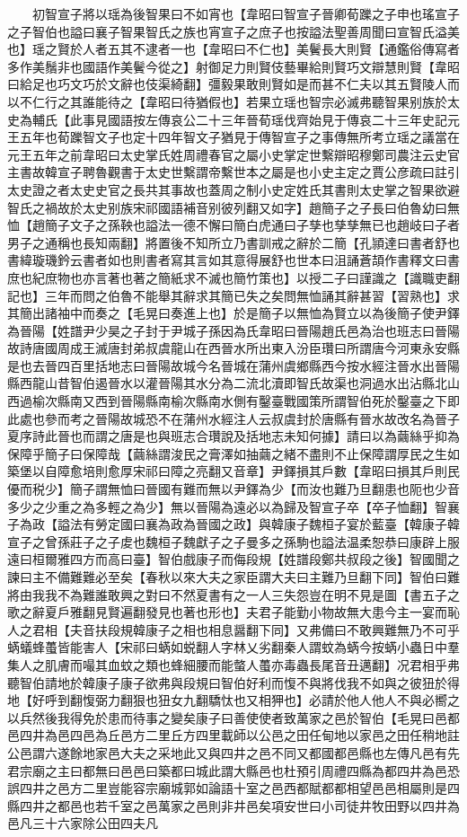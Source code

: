 　　初智宣子將以瑶為後智果曰不如宵也【韋昭曰智宣子晉卿荀躒之子申也瑤宣子之子智伯也謚曰襄子智果智氏之族也宵宣子之庶子也按謚法聖善周聞曰宣智氏溢美也】瑶之賢於人者五其不逮者一也【韋昭曰不仁也】美鬢長大則賢【通鑑俗傳寫者多作美鬚非也國語作美鬢今從之】射御足力則賢伎藝畢給則賢巧文辯慧則賢【韋昭曰給足也巧文巧於文辭也伎渠綺翻】彊毅果敢則賢如是而甚不仁夫以其五賢陵人而以不仁行之其誰能待之【韋昭曰待猶假也】若果立瑶也智宗必滅弗聽智果别族於太史為輔氏【此事見國語按左傳哀公二十三年晉荀瑶伐齊始見于傳哀二十三年史記元王五年也荀躒智文子也定十四年智文子猶見于傳智宣子之事傳無所考立瑶之議當在元王五年之前韋昭曰太史掌氏姓周禮春官之屬小史掌定世繫辯昭穆鄭司農注云史官主書故韓宣子聘魯觀書于太史世繫謂帝繫世本之屬是也小史主定之賈公彦疏曰註引太史證之者太史史官之長共其事故也蓋周之制小史定姓氏其書則太史掌之智果欲避智氏之禍故於太史别族宋祁國語補音别彼列翻又如字】趙簡子之子長曰伯魯幼曰無恤【趙簡子文子之孫鞅也謚法一德不懈曰簡白虎通曰子孳也孳孳無已也趙岐曰子者男子之通稱也長知兩翻】將置後不知所立乃書訓戒之辭於二簡【孔頴達曰書者舒也書緯璇璣鈐云書者如也則書者寫其言如其意得展舒也世本曰沮誦蒼頡作書釋文曰書庶也紀庶物也亦言著也著之簡紙求不滅也簡竹策也】以授二子曰謹識之【識職吏翻記也】三年而問之伯魯不能舉其辭求其簡已失之矣問無恤誦其辭甚習【習熟也】求其簡出諸袖中而奏之【毛晃曰奏進上也】於是簡子以無恤為賢立以為後簡子使尹鐸為晉陽【姓譜尹少昊之子封于尹城子孫因為氏韋昭曰晉陽趙氏邑為治也班志曰晉陽故詩唐國周成王滅唐封弟叔虞龍山在西晉水所出東入汾臣瓚曰所謂唐今河東永安縣是也去晉四百里括地志曰晉陽故城今名晉城在蒲州虞鄉縣西今按水經注晉水出晉陽縣西龍山昔智伯遏晉水以灌晉陽其水分為二流北瀆即智氏故渠也洞過水出沾縣北山西過榆次縣南又西到晉陽縣南榆次縣南水側有鑿臺戰國策所謂智伯死於鑿臺之下即此處也參而考之晉陽故城恐不在蒲州水經注人云叔虞封於唐縣有晉水故改名為晉子夏序詩此晉也而謂之唐是也與班志合瓚說及括地志未知何據】請曰以為繭絲乎抑為保障乎簡子曰保障哉【繭絲謂浚民之膏澤如抽繭之緒不盡則不止保障謂厚民之生如築堡以自障愈培則愈厚宋祁曰障之亮翻又音章】尹鐸損其戶數【韋昭曰損其戶則民優而税少】簡子謂無恤曰晉國有難而無以尹鐸為少【而汝也難乃旦翻患也阨也少音多少之少重之為多輕之為少】無以晉陽為遠必以為歸及智宣子卒【卒子恤翻】智襄子為政【謚法有勞定國曰襄為政為晉國之政】與韓康子魏桓子宴於藍臺【韓康子韓宣子之曾孫莊子之子䖍也魏桓子魏獻子之子曼多之孫駒也謚法温柔恕恭曰康辟上服遠曰桓爾雅四方而高曰臺】智伯戲康子而侮段規【姓譜段鄭共叔段之後】智國聞之諫曰主不備難難必至矣【春秋以來大夫之家臣謂大夫曰主難乃旦翻下同】智伯曰難將由我我不為難誰敢興之對曰不然夏書有之一人三失怨豈在明不見是圖【書五子之歌之辭夏戶雅翻見賢遍翻發見也著也形也】夫君子能勤小物故無大患今主一宴而恥人之君相【夫音扶段規韓康子之相也相息醤翻下同】又弗備曰不敢興難無乃不可乎蜹蟻蜂蠆皆能害人【宋祁曰蜹如蜕翻人字林乂劣翻秦人謂蚊為蜹今按蜹小蟲日中羣集人之肌膚而嘬其血蚊之類也蜂細腰而能螫人蠆亦毒蟲長尾音丑邁翻】况君相乎弗聽智伯請地於韓康子康子欲弗與段規曰智伯好利而愎不與將伐我不如與之彼狃於得地【好呼到翻愎弼力翻狠也狃女九翻驕忲也又相狎也】必請於他人他人不與必嚮之以兵然後我得免於患而待事之變矣康子曰善使使者致萬家之邑於智伯【毛晃曰邑都邑四井為邑四邑為丘邑方二里丘方四里載師以公邑之田任甸地以家邑之田任稍地註公邑謂六遂餘地家邑大夫之采地此又與四井之邑不同又都國都邑縣也左傳凡邑有先君宗廟之主曰都無曰邑邑曰築都曰城此謂大縣邑也杜預引周禮四縣為都四井為邑恐誤四井之邑方二里豈能容宗廟城郭如論語十室之邑西都賦都都相望邑邑相屬則是四縣四井之都邑也若千室之邑萬家之邑則非井邑矣項安世曰小司徒井牧田野以四井為邑凡三十六家除公田四夫凡